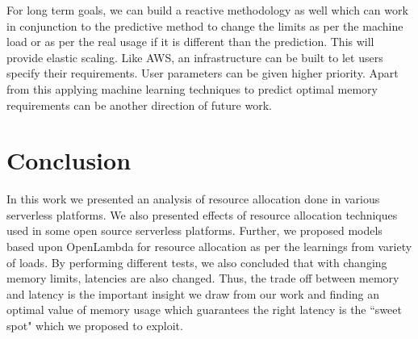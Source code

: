 \documentclass[letterpaper,twocolumn,10pt]{article}
\begin{document}
For long term goals, we can build a reactive methodology as well which can work in conjunction to the predictive method to change the limits as per the machine load or as per the real usage if it is different than the prediction. This will provide elastic scaling. Like AWS, an infrastructure can be built to let users specify their requirements. User parameters can be given higher priority. Apart from this applying machine learning techniques to predict optimal memory requirements can be another direction of future work.

\section{Conclusion}
\label{sec:sixth}
In this work we presented an analysis of resource allocation done in various serverless platforms. We also presented effects of resource allocation techniques used in some open source serverless platforms. Further, we proposed models based upon OpenLambda for resource allocation as per the learnings from variety of loads. By performing different tests, we also concluded that with changing memory limits, latencies are also changed. Thus, the trade off between memory and latency is the important insight we draw from our work and finding an optimal value of memory usage which guarantees the right latency is the ``sweet spot" which we proposed to exploit.



{
  \footnotesize 
  \small 
  
  
}
\end{document}

